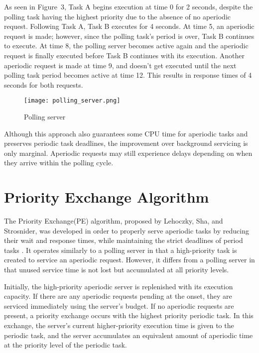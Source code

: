 \documentclass[conference]{IEEEtran}
\begin{document}
As seen in Figure~3, Task A begins execution at time 0 for 2 seconds, despite the polling task having the highest priority due to the absence of no aperiodic request. Following Task A, Task B executes for 4 seconds. At time 5, an aperiodic request is made; however, since the polling task's period is over, Task B continues to execute. At time 8, the polling server becomes active again and the aperiodic request is finally executed before Task B continues with its execution. Another aperiodic request is made at time 9, and doesn't get executed until the next polling task period becomes active at time 12. This results in response times of 4 seconds for both requests.

\begin{figure}[H]
    \centering
    \texttt{[image: polling\_server.png]}
    \caption{Polling server}
    \label{fig:polling}
\end{figure}

Although this approach also guarantees some CPU time for aperiodic tasks and preserves periodic task deadlines, the improvement over background servicing is only marginal. Aperiodic requests may still experience delays depending on when they arrive within the polling cycle.




\section{Priority Exchange Algorithm}
The Priority Exchange(PE) algorithm, proposed by Lehoczky, Sha, and Strosnider, was developed in order to properly serve aperiodic tasks by reducing their wait and response times, while maintaining the strict deadlines of period tasks \cite{lehoczky1987enhanced}. It operates similarly to a polling server in that a high-priority task is created to service an aperiodic request. However, it differs from a polling server in that unused service time is not lost but accumulated at all priority levels. 
 
Initially, the high-priority aperiodic server is replenished with its execution capacity. If there are any aperiodic requests pending at the onset, they are serviced immediately using the server's budget. If no aperiodic requests are present, a priority exchange occurs with the highest priority periodic task. In this exchange, the server's current higher-priority execution time is given to the periodic task, and the server accumulates an equivalent amount of aperiodic time at the priority level of the periodic task. 
\end{document}
